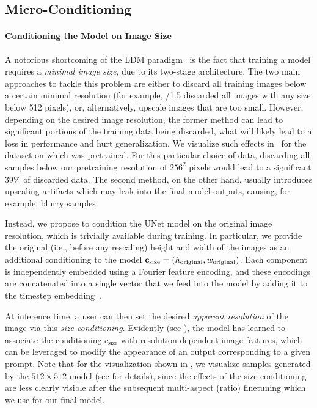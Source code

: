 \documentclass{article}
\begin{document}
%

%
%
%

%

%

%


%
\subsection{Micro-Conditioning}
\label{subsec:condtricks}
\sizedist
\paragraph{Conditioning the Model on Image Size}
A notorious shortcoming of the LDM paradigm~\cite{rombach2021high} is the fact that training a model requires a \emph{minimal image size}, due to its two-stage architecture. The two main approaches to tackle this problem are either to discard all training images below a certain minimal resolution (for example, /1.5 discarded all images with any size below 512 pixels), or, alternatively, upscale images that are too small. However, depending on the desired image resolution, the former method can lead to significant portions of the training data being discarded, what will likely lead to a loss in performance and hurt generalization. We visualize such effects in~ for the dataset on which \modelname was pretrained. For this particular choice of data, discarding all samples below our pretraining resolution of $256^2$ pixels would lead to a significant 39\% of discarded data. The second method, on the other hand, usually introduces upscaling artifacts which may leak into the final model outputs, causing, for example, blurry samples.


Instead, we propose to condition the UNet model on the original image resolution, which is trivially available during training.
%
In particular, we provide the original (i.e., before any rescaling) height and width of the images as an additional conditioning to the model $\mathbf{c}_{\text{size}} = (h_{\text{original}}, w_{\text{original}})$. Each component is independently embedded using a Fourier feature encoding, and these encodings are concatenated into a single vector that we feed into the model by adding it to the timestep embedding~\cite{dhariwal2021diffusion}. 

\sizecondvtwo
%

%
%
%
%

At inference time, a user can then set the desired \emph{apparent resolution} of the image via this \emph{size-conditioning}. Evidently (see ), the model has learned to associate the conditioning $c_{\text{size}}$ with resolution-dependent image features, which can be leveraged to modify the appearance of an output corresponding to a given prompt. Note that for the visualization shown in , we visualize samples generated by the $512 \times 512$ model (see  for details), since the effects of the size conditioning are less clearly visible after the subsequent multi-aspect (ratio) finetuning which we use for our final \modelname model.  
\end{document}

